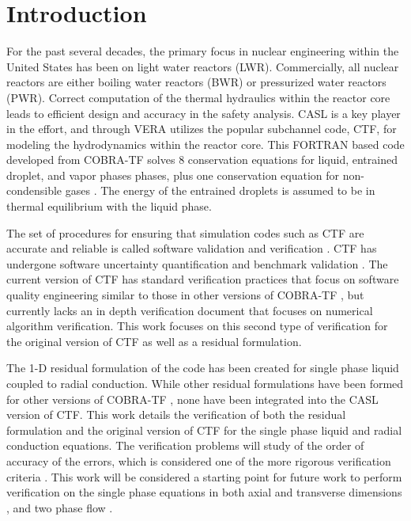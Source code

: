 
\vspace*{-80mm}
\chapter{Introduction} \label{chapter1:introduction}


For the past several decades, the primary focus in nuclear engineering within
the United States has been on light water reactors (LWR). Commercially,
all nuclear reactors are either boiling water reactors (BWR) or pressurized
water reactors (PWR). Correct computation of the thermal hydraulics within the
reactor core leads to efficient design and accuracy in the safety analysis. 
CASL is a key player in the effort, and through VERA \cite{Schmidt2014} utilizes
the popular subchannel code, CTF, for modeling the hydrodynamics within the reactor core.
This FORTRAN based code developed from COBRA-TF solves 8 conservation equations
for liquid, entrained droplet, and vapor phases phases, plus one conservation
equation for non-condensible gases \cite{CTF_theory}. The energy of the
entrained droplets is assumed to be in thermal equilibrium with the liquid
phase.

The set of procedures for ensuring that simulation codes such as CTF are
accurate and reliable is called software validation and verification
\cite{Oberkampf2008}. CTF has undergone software uncertainty quantification and
benchmark validation \cite{Avramova2015}. The current version of CTF has
standard verification practices that focus on software quality engineering
similar to those in other versions of COBRA-TF \cite{Aumiller2013}, but
currently lacks an in depth verification document that focuses on numerical
algorithm verification. This work focuses on this second type of verification
for the original version of CTF as well as a residual formulation. 

The 1-D residual formulation of the code has been created for single phase
liquid coupled to radial conduction. While other residual formulations have been
formed for other versions of COBRA-TF \cite{Lloyd2014}, none have been
integrated into the CASL version of CTF. This work details the verification of
both the residual formulation and the original version of CTF for the single
phase liquid and radial conduction equations. The verification problems will
study of the order of accuracy of the errors, which is considered one of the
more rigorous verification criteria \cite{Roy2005}. This work will be
considered a starting point for future work to perform verification on the
single phase equations in both axial and transverse dimensions
\cite{Merroun2009}, and two phase flow \cite{Mahadevan2009}.

